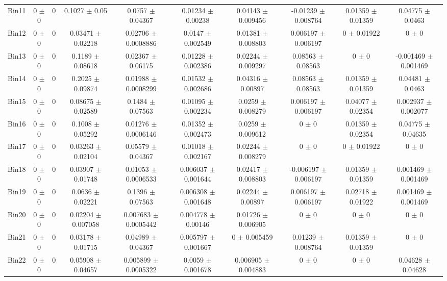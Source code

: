 \begin{tabular}{@{\extracolsep{4pt}}lccccccccc@{}}
     Bin11 & 0 $\pm$ 0 & 0 & 0.1027 $\pm$ 0.05 & 0.0757 $\pm$ 0.04367 & 0.01234 $\pm$ 0.00238 & 0.04143 $\pm$ 0.009456 & -0.01239 $\pm$ 0.008764 & 0.01359 $\pm$ 0.01359 & 0.04775 $\pm$ 0.0463 \\ 
     Bin12 & 0 $\pm$ 0 & 0 & 0.03471 $\pm$ 0.02218 & 0.02706 $\pm$ 0.0008886 & 0.0147 $\pm$ 0.002549 & 0.01381 $\pm$ 0.008803 & 0.006197 $\pm$ 0.006197 & 0 $\pm$ 0.01922 & 0 $\pm$ 0 \\ 
     Bin13 & 0 $\pm$ 0 & 0 & 0.1189 $\pm$ 0.08618 & 0.02367 $\pm$ 0.06175 & 0.01228 $\pm$ 0.002386 & 0.02244 $\pm$ 0.009297 & 0.08563 $\pm$ 0.08563 & 0 $\pm$ 0 & -0.001469 $\pm$ 0.001469 \\ 
     Bin14 & 0 $\pm$ 0 & 0 & 0.2025 $\pm$ 0.09874 & 0.01988 $\pm$ 0.0008299 & 0.01532 $\pm$ 0.002686 & 0.04316 $\pm$ 0.00897 & 0.08563 $\pm$ 0.08563 & 0.01359 $\pm$ 0.01359 & 0.04481 $\pm$ 0.0463 \\ 
     Bin15 & 0 $\pm$ 0 & 0 & 0.08675 $\pm$ 0.02589 & 0.1484 $\pm$ 0.07563 & 0.01095 $\pm$ 0.002234 & 0.0259 $\pm$ 0.008279 & 0.006197 $\pm$ 0.006197 & 0.04077 $\pm$ 0.02354 & 0.002937 $\pm$ 0.002077 \\ 
     Bin16 & 0 $\pm$ 0 & 0 & 0.1008 $\pm$ 0.05292 & 0.01276 $\pm$ 0.0006146 & 0.01352 $\pm$ 0.002473 & 0.0259 $\pm$ 0.009612 & 0 $\pm$ 0 & 0.01359 $\pm$ 0.02354 & 0.04775 $\pm$ 0.04635 \\ 
     Bin17 & 0 $\pm$ 0 & 0 & 0.03263 $\pm$ 0.02104 & 0.05579 $\pm$ 0.04367 & 0.01018 $\pm$ 0.002167 & 0.02244 $\pm$ 0.008279 & 0 $\pm$ 0 & 0 $\pm$ 0.01922 & 0 $\pm$ 0 \\ 
     Bin18 & 0 $\pm$ 0 & 0 & 0.03907 $\pm$ 0.01748 & 0.01053 $\pm$ 0.0006533 & 0.006037 $\pm$ 0.001644 & 0.02417 $\pm$ 0.008803 & -0.006197 $\pm$ 0.006197 & 0.01359 $\pm$ 0.01359 & 0.001469 $\pm$ 0.001469 \\ 
     Bin19 & 0 $\pm$ 0 & 0 & 0.0636 $\pm$ 0.02221 & 0.1396 $\pm$ 0.07563 & 0.006308 $\pm$ 0.001648 & 0.02244 $\pm$ 0.00897 & 0.006197 $\pm$ 0.006197 & 0.02718 $\pm$ 0.01922 & 0.001469 $\pm$ 0.001469 \\ 
     Bin20 & 0 $\pm$ 0 & 0 & 0.02204 $\pm$ 0.007058 & 0.007683 $\pm$ 0.0005442 & 0.004778 $\pm$ 0.00146 & 0.01726 $\pm$ 0.006905 & 0 $\pm$ 0 & 0 $\pm$ 0 & 0 $\pm$ 0 \\ 
     Bin21 & 0 $\pm$ 0 & 0 & 0.03178 $\pm$ 0.01715 & 0.04989 $\pm$ 0.04367 & 0.005797 $\pm$ 0.001667 & 0 $\pm$ 0.005459 & 0.01239 $\pm$ 0.008764 & 0.01359 $\pm$ 0.01359 & 0 $\pm$ 0 \\ 
     Bin22 & 0 $\pm$ 0 & 0 & 0.05908 $\pm$ 0.04657 & 0.005899 $\pm$ 0.0005322 & 0.0059 $\pm$ 0.001678 & 0.006905 $\pm$ 0.004883 & 0 $\pm$ 0 & 0 $\pm$ 0 & 0.04628 $\pm$ 0.04628 \\ 

\end{tabular}
